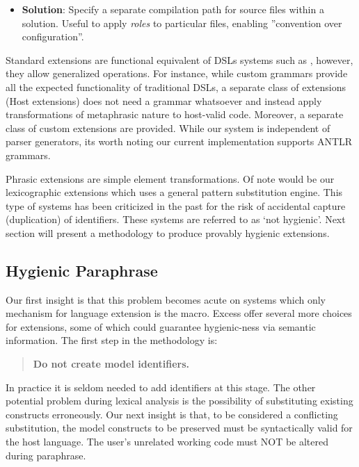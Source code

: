 \documentclass[conference]{IEEEtran}
\begin{document}
\begin{itemize}
    \item \textbf{Solution}: Specify a separate compilation path for source files within a solution. Useful to apply \textit{roles} to particular files, enabling ''convention over configuration''.
 \end{itemize}

Standard extensions are functional equivalent of DSLs systems such as \cite{Brown, Racket}, however, they allow generalized operations. For instance, while custom grammars provide all the expected functionality of traditional DSLs, a separate class of extensions (Host extensions) does not need a grammar whatsoever and instead apply transformations of metaphrasic nature to host-valid code. Moreover, a separate class of custom extensions are provided. While our system is independent of parser generators, its worth noting our current implementation supports ANTLR \cite{ANTLR} grammars.

Phrasic extensions are simple element transformations. Of note would be our lexicographic extensions which uses a general pattern substitution engine. This type of systems has been criticized in the past  for the risk of accidental capture (duplication) of identifiers. These systems are referred to as `not hygienic'. Next section will present a methodology to produce provably hygienic extensions.

\subsection{Hygienic Paraphrase}

Our first insight is that this problem becomes acute on systems which only mechanism for language extension is the macro. Excess offer several more choices for extensions, some of which could guarantee hygienic-ness via semantic information. 
The first step in the methodology is:

\begin{quotation}
{\textbf{Do not create model identifiers.}}
\end{quotation}

In practice it is seldom needed to add identifiers at this stage. The other potential problem during lexical analysis is the possibility of substituting existing constructs erroneously. Our next insight is that, to be considered a conflicting substitution, the model constructs to be preserved must be syntactically valid for the host language. The user’s unrelated working code must NOT be altered during paraphrase.
\end{document}

